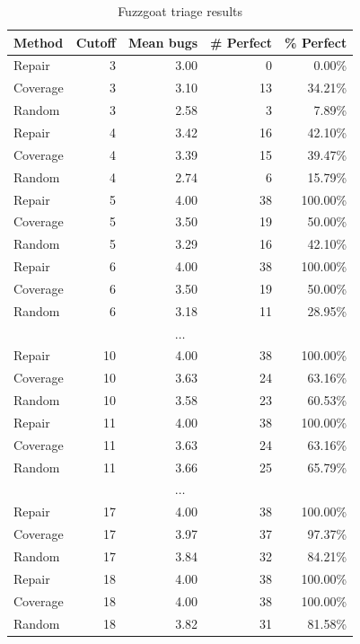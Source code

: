 \begin{table}
\centering
{\scriptsize
\begin{tabular}{|l||r|r|r|r|}
\hline
Method & Cutoff & Mean bugs & \# Perfect & \% Perfect\\
  \hline
  Repair & 3 & 3.00 & 0 & 0.00\% \\
  Coverage & 3 &  3.10 & 13 & 34.21\% \\
  Random & 3 & 2.58 & 3 & 7.89\%\\
  \hline
  Repair & 4 & 3.42 & 16 & 42.10\%\\
  Coverage & 4 &  3.39 & 15 & 39.47\% \\
  Random & 4 & 2.74 & 6 & 15.79\%\\  
  \hline 
    Repair & 5 & 4.00 & 38 & 100.00\%\\
  Coverage & 5 &  3.50 & 19 & 50.00\%\\
  Random & 5 & 3.29 & 16 & 42.10\%\\  
  \hline
    Repair & 6 & 4.00 & 38 & 100.00\% \\
  Coverage & 6 &  3.50 & 19 & 50.00\%\\
  Random & 6 & 3.18 & 11 & 28.95\%\\
  \hline
  \multicolumn{5}{c}{$\ldots$} \\
\hline 
    Repair & 10 & 4.00 & 38 & 100.00\% \\
  Coverage & 10 &  3.63 & 24 & 63.16\%\\
  Random & 10 & 3.58 & 23 & 60.53\%\\  
  \hline
    Repair & 11 & 4.00 & 38 & 100.00\% \\
  Coverage & 11 &  3.63 & 24 & 63.16\%\\
  Random & 11 & 3.66 & 25 & 65.79\%\\  
  \hline
    \multicolumn{5}{c}{$\ldots$} \\
  \hline
    Repair & 17 & 4.00 & 38 & 100.00\% \\
  Coverage & 17 &  3.97 & 37 & 97.37\%\\
  Random & 17 & 3.84 & 32 & 84.21\%\\  
  \hline
    Repair & 18 & 4.00 & 38 & 100.00\% \\
  Coverage & 18 &  4.00 & 38 & 100.00\% \\ 
  Random & 18 & 3.82 & 31 & 81.58\%\\  
  \hline
\end{tabular}
}
\caption{Fuzzgoat triage results}
\label{table:fuzzgoat}
\end{table}

